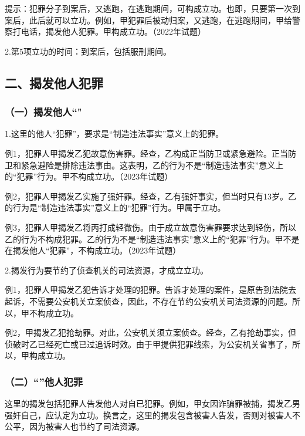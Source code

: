 提示：犯罪分子到案后，又逃跑，在逃跑期间，可构成立功。也即，只要第一次到案后，此后就可以立功。例如，甲犯罪后被动归案，又逃跑，在逃跑期间，甲给警察打电话，揭发他人犯罪。甲构成立功。（2022年试题）

2.第5项立功的时间：到案后，包括服刑期间。

\subsection*{二、揭发他人犯罪}

\subsubsection*{（一）揭发他人“"\protect\footnotemark}

1.这里的他人“犯罪”，要求是“制造违法事实”意义上的犯罪。

例1，犯罪人甲揭发乙犯故意伤害罪。经查，乙构成正当防卫或紧急避险。正当防卫和紧急避险是排除违法事由。这表明，乙的行为不是“制造违法事实”意义上的“犯罪”行为。甲不构成立功。（2023年试题）

例2，犯罪人甲揭发乙实施了强奸罪。经查，乙有强奸事实，但当时只有13岁。乙的行为是“制造违法事实”意义上的“犯罪”行为。甲属于立功。

例3，犯罪人甲揭发乙将丙打成轻微伤。由于成立故意伤害罪要求达到轻伤，所以乙的行为不构成犯罪。乙的行为不是“制造违法事实”意义上的“犯罪”行为。甲不是在揭发他人“犯罪”，不构成立功。（2023年试题）

2.揭发行为要节约了侦查机关的司法资源，才成立立功。

例1，犯罪人甲揭发乙犯告诉才处理的犯罪。告诉才处理的案件，是原告到法院去起诉，不需要公安机关立案侦查，因此，不存在节约公安机关司法资源的问题。所以，甲不构成立功。

例2，甲揭发乙犯抢劫罪。对此，公安机关须立案侦查。经查，乙有抢劫事实，但侦破时乙已经死亡或已过追诉时效。由于甲提供犯罪线索，为公安机关省事了，所以，甲构成立功。

\subsubsection*{（二）“”他人犯罪}

这里的揭发包括犯罪人告发他人对自已犯罪。例如，甲女因诈骗罪被捕，揭发乙男强奸自己，应认定为立功。换言之，这里的揭发包含被害人告发，否则对被害人不公平，因为被害人也节约了司法资源。

